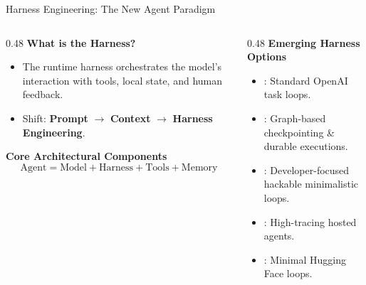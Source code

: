 \begin{frame}{Harness Engineering: The New Agent Paradigm}
  \begin{columns}[T, onlytextwidth]
    \begin{column}{0.48\textwidth}
      \textbf{What is the Harness?}
      \begin{itemize}
        \item The runtime harness orchestrates the model's interaction with tools, local state, and human feedback.
        \item Shift: \textbf{Prompt} $\to$ \textbf{Context} $\to$ \textbf{Harness Engineering}.
      \end{itemize}
      \vspace{0.4em}
      \textbf{Core Architectural Components}
      $$\text{Agent} = \text{Model} + \text{Harness} + \text{Tools} + \text{Memory}$$
    \end{column}
    \hfill
    \begin{column}{0.48\textwidth}
      \textbf{Emerging Harness Options}
      \begin{itemize}
        \item {}: Standard OpenAI task loops.
        \item {}: Graph-based checkpointing \& durable executions.
        \item {}: Developer-focused hackable minimalistic loops.
        \item {}: High-tracing hosted agents.
        \item {}: Minimal Hugging Face loops.
      \end{itemize}
    \end{column}
  \end{columns}
\end{frame}

